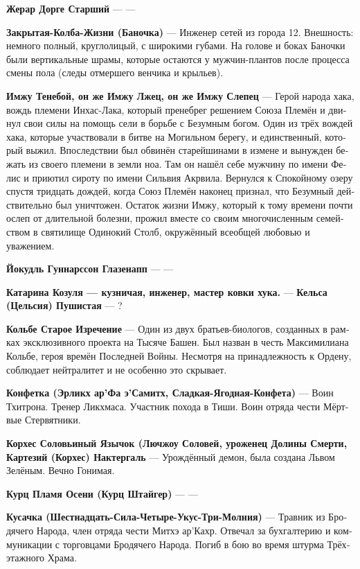 \documentclass[a4paper,12pt,fleqn]{book}\usepackage{cooltooltips}\usepackage{polyglossia}\setdefaultlanguage[babelshorthands=true]{russian}\setotherlanguage{english}\defaultfontfeatures{Ligatures=TeX,Mapping=tex-text} \usepackage{xcolor}\definecolor{lightgray}{HTML}{bbbbbb}\color{lightgray}\newcommand{\ml}[3]{\textenglish{\textcolor{black}{#3}}}
\newcommand{\theterm}[3]{\textbf{\hypertarget{#1}{#2}} --- #3}
\begin{document}
{\theterm{dourgue-senior} %
{Жерар Дорге Старший}
{---}

\theterm{flask} %
{Закрытая-Колба-Жизни (Баночка)}
{Инженер сетей из города 12.
Внешность: немного полный, круглолицый, с широкими губами.
На голове и боках Баночки были вертикальные шрамы, которые остаются у мужчин-плантов после процесса смены пола (следы отмершего венчика и крыльев).}

\theterm{imzhu}
{Имжу Тенебой, он же Имжу Лжец, он же Имжу Слепец}
{Герой народа хака, вождь племени Инхас-Лака, который пренебрег решением Союза Племён и двинул свои силы на помощь сели в борьбе с Безумным богом.
Один из трёх вождей хака, которые участвовали в битве на Могильном берегу, и единственный, который выжил.
Впоследствии был обвинён старейшинами в измене и вынужден бежать из своего племени в земли ноа.
Там он нашёл себе мужчину по имени Фелис и приютил сироту по имени Сильвия Акрвила.
Вернулся к Спокойному озеру спустя тридцать дождей, когда Союз Племён наконец признал, что Безумный действительно был уничтожен.
Остаток жизни Имжу, который к тому времени почти ослеп от длительной болезни, прожил вместе со своим многочисленным семейством в святилище Одинокий Столб, окружённый всеобщей любовью и уважением.}

\theterm{jokull}
{Йокудль Гуннарссон Глазенапп}
{---}

\theterm{katarina} %
{Катарина Козуля --- кузничая, инженер, мастер ковки хука.}

\theterm{celsa}
{Кельса (Цельсия) Пушистая}
{?}

\theterm{colbe} %
{Кольбе Старое Изречение}
{Один из двух братьев-биологов, созданных в рамках эксклюзивного проекта на Тысяче Башен.
Был назван в честь Максимилиана Кольбе, героя времён Последней Войны.
Несмотря на принадлежность к Ордену, соблюдает нейтралитет и не особенно это скрывает.}

\theterm{candy} %
{Конфетка (Эрликх ар’Фа э’Самитх, Сладкая-Ягодная-Конфета)}
{Воин Тхитрона.
Тренер Ликхмаса.
Участник похода в Тиши.
Воин отряда чести Мёртвые Стервятники.}

\theterm{corjes}
{Корхес Соловьиный Язычок (Лючжоу Соловей, уроженец Долины Смерти, Картезий (Корхес) Нактергаль}
{Урождённый демон, была создана Львом Зелёным.
Вечно Гонимая.}

\theterm{kurz}
{Курц Пламя Осени (Курц Штайгер)}
{---}

\theterm{biter}
{Кусачка (Шестнадцать-Сила-Четыре-Укус-Три-Молния)}
{Травник из Бродячего Народа, член отряда чести Митхэ ар'Кахр.
Отвечал за бухгалтерию и коммуникации с торговцами Бродячего Народа.
Погиб в бою во время штурма Трёхэтажного Храма.}

}
\end{document}

